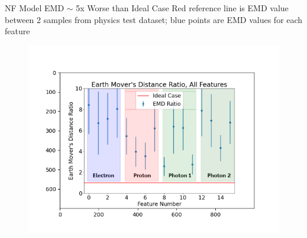 \documentclass[aspectratio=169]{beamer}
\begin{document}
\begin{frame}{NF Model EMD $\sim$ 5x Worse than Ideal Case}
Red reference line is EMD value between 2 samples from physics test dataset; blue points are EMD values for each feature
\begin{figure}[!h]
    \centering
    \includegraphics[width=.6\textwidth,trim={2.5cm 1.75cm 2cm 2.1cm},clip]{images/EMD/nflow_emd_with_text.png}
    \label{fig:EMD}
\end{figure}
\end{frame}
\end{document}
